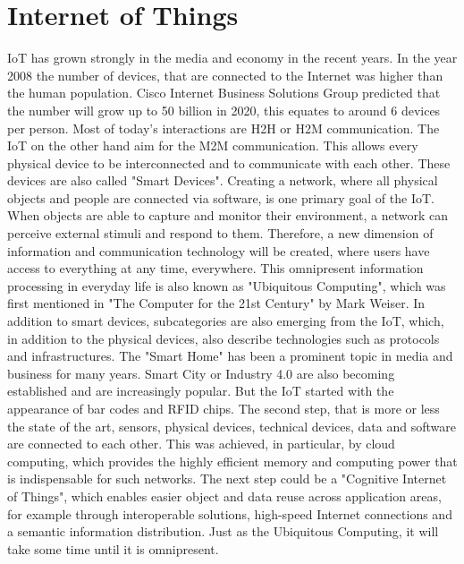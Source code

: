 \section{Internet of Things}
\ac{IoT} has grown strongly in the media and economy in the recent years.
In the year 2008 the number of devices, that are connected to the Internet was higher than the human population.\autocite[cf.][p. 3]{Eva:2011}
Cisco Internet Business Solutions Group predicted that the number will grow up to 50 billion in 2020, this equates to around 6 devices per person.\autocite[cf.][p. 4]{Eva:2011}
Most of today's interactions are \ac{H2H} or \ac{H2M} communication.
The \ac{IoT} on the other hand aim for the \ac{M2M} communication.
This allows every physical device to be interconnected and to communicate with each other.
These devices are also called "Smart Devices".
Creating a network, where all physical objects and people are connected via software, is one primary goal of the \ac{IoT}.\autocite[cf.][p.206]{Rui:2015}\autocite[cf.][p.2]{Kra:2013}
When objects are able to capture and monitor their environment, a network can perceive external stimuli and respond to them.\autocite[cf.][p. 40]{Itu11}
Therefore, a new dimension of information and communication technology will be created, where users have access to everything at any time, everywhere.
This omnipresent information processing in everyday life is also known as "Ubiquitous Computing", which was first mentioned in "The Computer for the 21st Century"\autocite{Wei:1991} by Mark Weiser.
In addition to smart devices, subcategories are also emerging from the \ac{IoT}, which, in addition to the physical devices, also describe technologies such as protocols and infrastructures.
The "Smart Home" has been a prominent topic in media and business for many years.
Smart City or Industry 4.0 are also becoming established and are increasingly popular.
But the \ac{IoT} started with the appearance of bar codes and \ac{RFID} chips.\autocite[cf.][p. 13]{Kra:2013}
The second step, that is more or less the state of the art, sensors, physical devices, technical devices, data and software are connected to each other.\autocite[cf.][p. 13]{Kra:2013}
This was achieved, in particular, by cloud computing, which provides the highly efficient memory and computing power that is indispensable for such networks.\autocite[cf.][p. 206]{Rui:2015}
The next step could be a "Cognitive Internet of Things", which enables easier object and data reuse across application areas, for example through interoperable solutions, high-speed Internet connections and a semantic information distribution.\autocite[cf.][p. V]{Kra:2013}
Just as the Ubiquitous Computing, it will take some time until it is omnipresent.


